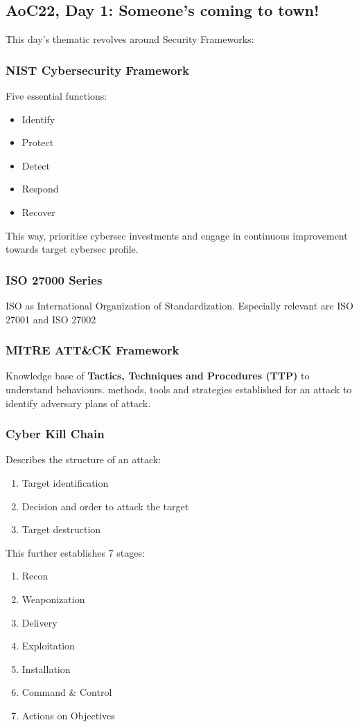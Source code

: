 \subsection*{AoC22, Day 1: Someone's coming to town!}
This day's thematic revolves around Security Frameworks: 
\subsubsection*{NIST Cybersecurity Framework}
	Five essential functions:
	\begin{itemize}
	\item Identify
	\item Protect
	\item Detect
	\item Respond
	\item Recover
	\end{itemize}
	This way, prioritise cybersec investments and engage in continuous improvement towards target cybersec profile. 
	
\subsubsection*{ISO 27000 Series}
ISO as International Organization of Standardization. Especially relevant are ISO 27001 and ISO 27002

\subsubsection*{MITRE ATT\&CK Framework}
Knowledge base of \textbf{Tactics, Techniques and Procedures (TTP)} to understand behaviours. methods, tools and strategies established for an attack to identify adversary plans of attack. 
\subsubsection*{Cyber Kill Chain}
Describes the structure of an attack: 
\begin{enumerate}
\item Target identification
\item Decision and order to attack the target
\item Target destruction
\end{enumerate}

This further establishes 7 stages: 
\begin{enumerate}
\item Recon
\item Weaponization
\item Delivery
\item Exploitation
\item Installation
\item Command \& Control
\item Actions on Objectives
\end{enumerate}

